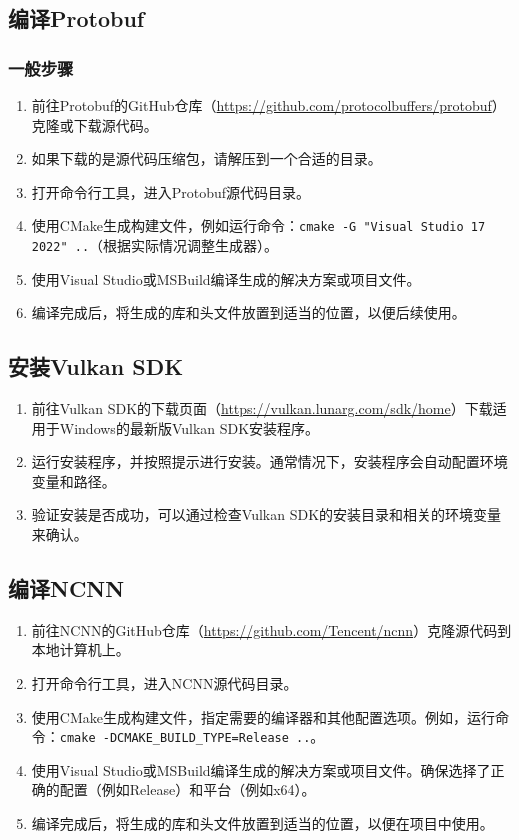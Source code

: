 \subsection{编译Protobuf}

\subsubsection{一般步骤}

\begin{enumerate}
	\item 前往Protobuf的GitHub仓库（\url{https://github.com/protocolbuffers/protobuf}）克隆或下载源代码。
	\item 如果下载的是源代码压缩包，请解压到一个合适的目录。
	\item 打开命令行工具，进入Protobuf源代码目录。
	\item 使用CMake生成构建文件，例如运行命令：\texttt{cmake -G "Visual Studio 17 2022" ..}（根据实际情况调整生成器）。
	\item 使用Visual Studio或MSBuild编译生成的解决方案或项目文件。
	\item 编译完成后，将生成的库和头文件放置到适当的位置，以便后续使用。
\end{enumerate}

\subsection{安装Vulkan SDK}

\begin{enumerate}
	\item 前往Vulkan SDK的下载页面（\url{https://vulkan.lunarg.com/sdk/home}）下载适用于Windows的最新版Vulkan SDK安装程序。
	\item 运行安装程序，并按照提示进行安装。通常情况下，安装程序会自动配置环境变量和路径。
	\item 验证安装是否成功，可以通过检查Vulkan SDK的安装目录和相关的环境变量来确认。
\end{enumerate}

\subsection{编译NCNN}

\begin{enumerate}
	\item 前往NCNN的GitHub仓库（\url{https://github.com/Tencent/ncnn}）克隆源代码到本地计算机上。
	\item 打开命令行工具，进入NCNN源代码目录。
	\item 使用CMake生成构建文件，指定需要的编译器和其他配置选项。例如，运行命令：\texttt{cmake -DCMAKE\_BUILD\_TYPE=Release ..}。
	\item 使用Visual Studio或MSBuild编译生成的解决方案或项目文件。确保选择了正确的配置（例如Release）和平台（例如x64）。
	\item 编译完成后，将生成的库和头文件放置到适当的位置，以便在项目中使用。
\end{enumerate}

